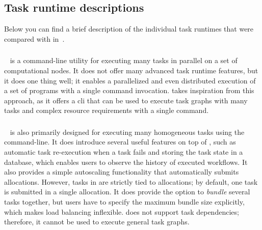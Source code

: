 \begin{spacing}{1}
\chapter{Task runtime descriptions}
\label{app:task-runtime-descriptions}
Below you can find a brief description of the individual task runtimes that were compared with \hyperqueue{} in~.

\subsection*{\gnuparallel}
\gnuparallel~\cite{parallel} is a command-line utility for executing many tasks in
parallel on a set of computational nodes. It does not offer many advanced task runtime features,
but it does one thing well; it enables a parallelized and even distributed execution of a set of
programs with a single command invocation. \hyperqueue{} takes inspiration from this
approach, as it offers a \gls{cli} that can be used to execute task graphs with many
tasks and complex resource requirements with a single command.

\subsection*{\hypershell}
\hypershell~\cite{hypershell} is also primarily designed for
executing many homogeneous tasks using the command-line. It does introduce several useful features
on top of \gnuparallel{}, such as automatic task re-execution when a task fails and storing the task
state in a database, which enables users to observe the history of executed workflows. It also
provides a simple autoscaling functionality that automatically submits allocations. However, tasks
in \hypershell{} are strictly tied to allocations; by default, one task is submitted in a single
allocation. It does provide the option to \emph{bundle} several tasks together, but users
have to specify the maximum bundle size explicitly, which makes load balancing inflexible.
\hypershell{} does not support task dependencies; therefore, it cannot be used to execute general
task graphs.


\end{spacing}
